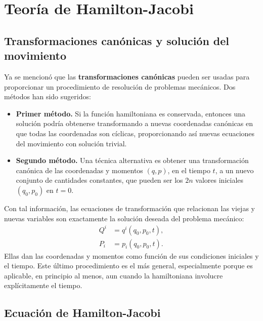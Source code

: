 \documentclass[../apunte_mecanica_clasica.tex]{subfiles}%
\begin{document}
\chapter{Teoría de Hamilton-Jacobi}
\label{ch:teoria-hamilton-jacobi}

\section{Transformaciones canónicas y solución del movimiento}
\label{sec:hj-transformaciones-canonicas}

Ya se mencionó que las \textbf{transformaciones canónicas} pueden ser usadas para proporcionar un procedimiento de resolución de problemas mecánicos. Dos métodos han sido sugeridos:
\begin{itemize}
    \item \textbf{Primer método.} Si la función hamiltoniana es conservada, entonces una solución podría obtenerse transformando a nuevas coordenadas canónicas en que todas las coordenadas son cíclicas, proporcionando así nuevas ecuaciones del movimiento con solución trivial.
    \item \textbf{Segundo método.} Una técnica alternativa es obtener una transformación canónica de las coordenadas y momentos $(q,p)$, en el tiempo $t$, a un nuevo conjunto de cantidades constantes, que pueden ser los $2n$ valores iniciales $(q_0,p_0)$ en $t=0$.
\end{itemize}

Con tal información, las ecuaciones de transformación que relacionan las viejas y nuevas variables son exactamente la solución deseada del problema mecánico:
\begin{align}
    Q^i &= q^i(q_0,p_0,t),
    \label{eq:hj-qi-solucion}\\
    P_i &= p_i(q_0,p_0,t).
    \label{eq:hj-pi-solucion}
\end{align}
Ellas dan las coordenadas y momentos como función de sus condiciones iniciales y el tiempo. Este último procedimiento es el más general, especialmente porque es aplicable, en principio al menos, aun cuando la hamiltoniana involucre explícitamente el tiempo.

\section{Ecuación de Hamilton-Jacobi}
\label{sec:hj-ecuacion-hamilton-jacobi}
\end{document}
